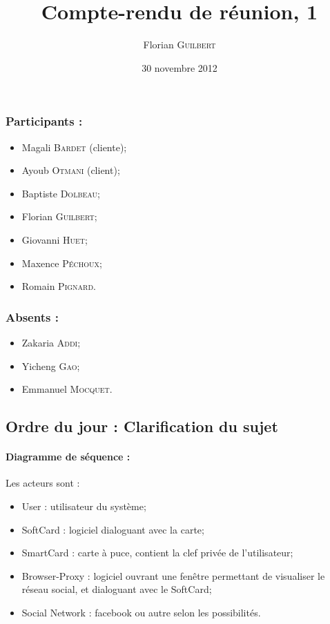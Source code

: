 \documentclass[a4paper,10pt]{article}
\author{Florian \textsc{Guilbert}}
\title{Compte-rendu de réunion, 1}
\date{30 novembre 2012}
\begin{document}
\maketitle

\subsubsection*{Participants : }
\begin{itemize}
    \item Magali \textsc{Bardet} (cliente);
    \item Ayoub \textsc{Otmani} (client);
    \item Baptiste \textsc{Dolbeau};
    \item Florian \textsc{Guilbert};
    \item Giovanni \textsc{Huet};
    \item Maxence  \textsc{Péchoux};
    \item Romain \textsc{Pignard}.
\end{itemize}

\subsubsection*{Absents : }
\begin{itemize}
    \item Zakaria \textsc{Addi};
    \item Yicheng \textsc{Gao};
    \item Emmanuel  \textsc{Mocquet}.
\end{itemize}

\subsection*{Ordre du jour : Clarification du sujet}

\paragraph{Diagramme de séquence :}

    Les acteurs sont : 
    \begin{itemize}
        \item User : utilisateur du système;
        \item SoftCard : logiciel dialoguant avec la carte;
        \item SmartCard : carte à puce, contient la clef privée de l'utilisateur;
        \item Browser-Proxy : logiciel ouvrant une fenêtre permettant de visualiser le réseau social,
            et dialoguant avec le SoftCard;
        \item Social Network : facebook ou autre selon les possibilités.
    \end{itemize}
    
\end{document}
